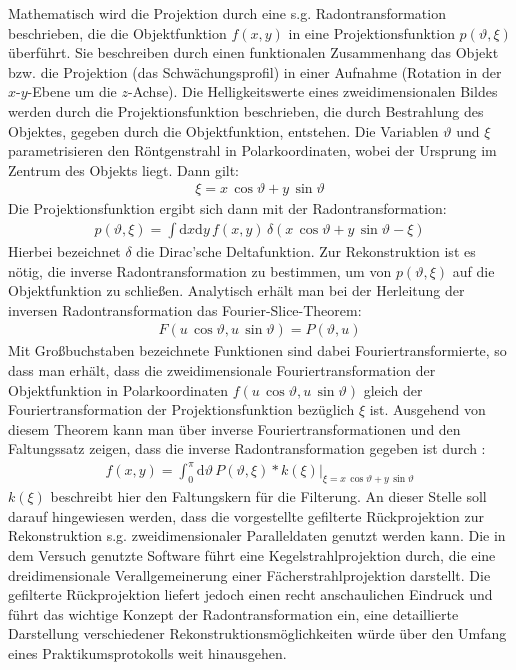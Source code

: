 \documentclass[11pt, a4paper]{article}
\numberwithin{equation}{section}
\begin{document}
Mathematisch wird die Projektion durch eine s.g. Radontransformation beschrieben, die die Objektfunktion $f(x, y)$ in eine Projektionsfunktion $p(\vartheta, \xi)$ überführt.
Sie beschreiben durch einen funktionalen Zusammenhang das Objekt bzw. die Projektion (das Schwächungsprofil) in einer Aufnahme (Rotation in der $x$-$y$-Ebene um die $z$-Achse).
Die Helligkeitswerte eines zweidimensionalen Bildes werden durch die Projektionsfunktion beschrieben, die durch Bestrahlung des Objektes, gegeben durch die Objektfunktion, entstehen.
Die Variablen $\vartheta$ und $\xi$ parametrisieren den Röntgenstrahl in Polarkoordinaten, wobei der Ursprung im Zentrum des Objekts liegt.
Dann gilt:
\begin{align}
\xi=x\,\cos\vartheta + y\,\sin\vartheta
\end{align}
Die Projektionsfunktion ergibt sich dann mit der Radontransformation:
\begin{align}
p(\vartheta, \xi)=\int\mathrm{d}x\mathrm{d}y\,f(x, y)\,\delta(x\,\cos\vartheta + y\,\sin\vartheta - \xi)
\end{align}
Hierbei bezeichnet $\delta$ die Dirac'sche Deltafunktion.
Zur Rekonstruktion ist es nötig, die inverse Radontransformation zu bestimmen, um von $p(\vartheta, \xi)$ auf die Objektfunktion zu schließen.
Analytisch erhält man bei der Herleitung der inversen Radontransformation das Fourier-Slice-Theorem:
\begin{align}
F(u\,\cos\vartheta, u\,\sin\vartheta)=P(\vartheta, u)
\end{align}
Mit Großbuchstaben bezeichnete Funktionen sind dabei Fouriertransformierte, so dass man erhält, dass die zweidimensionale Fouriertransformation der Objektfunktion in Polarkoordinaten $f(u\,\cos\vartheta, u\,\sin\vartheta)$ gleich der Fouriertransformation der Projektionsfunktion bezüglich $\xi$ ist.
Ausgehend von diesem Theorem kann man über inverse Fouriertransformationen und den Faltungssatz zeigen, dass die inverse Radontransformation gegeben ist durch \cite{kalender}:
\begin{align}
f(x,y)=\int_{0}^{\pi}\left.\mathrm{d}\vartheta\,P(\vartheta, \xi)*k(\xi)\right|_{\xi=x\,\cos\vartheta + y\,\sin\vartheta}
\end{align}
$k(\xi)$ beschreibt hier den Faltungskern für die Filterung.
An dieser Stelle soll darauf hingewiesen werden, dass die vorgestellte gefilterte Rückprojektion zur Rekonstruktion s.g. zweidimensionaler Paralleldaten genutzt werden kann.
Die in dem Versuch genutzte Software führt eine Kegelstrahlprojektion durch, die eine dreidimensionale Verallgemeinerung einer Fächerstrahlprojektion darstellt.
Die gefilterte Rückprojektion liefert jedoch einen recht anschaulichen Eindruck und führt das wichtige Konzept der Radontransformation ein, eine detaillierte Darstellung verschiedener Rekonstruktionsmöglichkeiten würde über den Umfang eines Praktikumsprotokolls weit hinausgehen.
\end{document}
